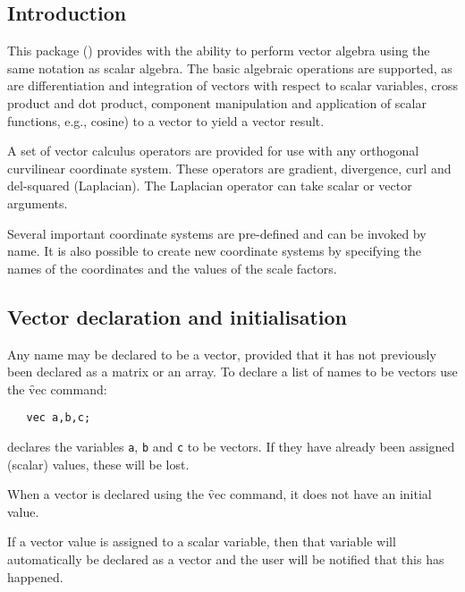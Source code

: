 
\setcounter{examplectr}{0}


\subsection{Introduction}

This package (\cite{Harper:89a})
provides
\REDUCE with the ability to perform vector algebra using the same
notation as scalar algebra.  The basic algebraic operations are
supported, as are differentiation and integration of vectors with
respect to scalar variables, cross product and dot product, component
manipulation and application of scalar functions, e.g., cosine)
to a vector to yield a vector result.

A set of vector calculus operators are provided for use with any
orthogonal curvilinear coordinate system. These operators are
gradient, divergence, curl and del-squared (Laplacian).  The Laplacian
operator can take scalar or vector arguments.

Several important coordinate systems are pre-defined and can be
invoked by name. It is also possible to create new coordinate systems
by specifying the names of the coordinates and the values of the scale
factors.

\subsection{Vector declaration and initialisation}

Any name may be declared to be a vector, provided that it has
not previously been declared as a matrix or an array. To
declare a list of names to be vectors use the \f{vec} command:
\hypertarget{command:VEC}{}
\begin{verbatim}
   vec a,b,c;
\end{verbatim}
declares the variables \texttt{a}, \texttt{b} and \texttt{c} to be vectors.
If they have already been assigned (scalar) values, these will be lost.

When a vector is declared using the \f{vec} command, it does not
have an initial value.

If a vector value is assigned to a scalar variable, then that
variable will automatically be declared as a vector and the
user will be notified that this has happened.

